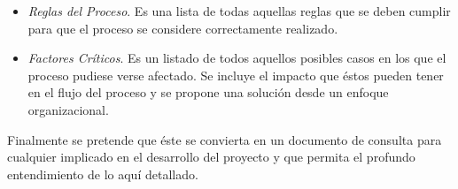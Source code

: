 \begin{footnotesize}
\begin{itemize}
\item \textit{Reglas del Proceso}. Es una lista de todas aquellas reglas que se deben cumplir para que el proceso se considere correctamente realizado.\\
\item \textit{Factores Críticos}. Es un listado de todos aquellos posibles casos en los que el proceso pudiese verse afectado. Se incluye el impacto que éstos pueden tener en el flujo del proceso y se propone una solución desde un enfoque organizacional.\\
\end {itemize}

Finalmente se pretende que éste se convierta en un documento de consulta para cualquier implicado en el desarrollo del proyecto y que permita el profundo entendimiento de lo aquí detallado.

\end{footnotesize}

